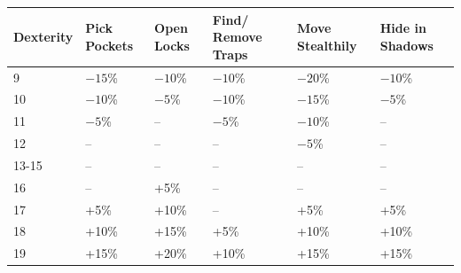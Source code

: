 \noindent
\begin{minipage}{\columnwidth}

\label{thiefdexmods}
\noindent
\begin{tabular}{|m{}|m{}|m{}|m{}|m{}|m{}|}
\hline
Dexterity	& Pick Pockets	& Open Locks	& Find/ Remove Traps	& Move Stealthily	& Hide in Shadows \\
\hline\hline
\rowcolor[gray]{.9}9		& $-15$\%	& $-10$\%	& $-10$\%	& $-20$\%	& $-10$\% \\
10		& $-10$\%	& $-5$\%	& $-10$\%	& $-15$\%	& $-5$\% \\
\rowcolor[gray]{.9}11		& $-5$\%	& --		& $-5$\%	& $-10$\%	& -- \\
12		& --		& --		& --		& $-5$\%	& -- \\
\rowcolor[gray]{.9}13-15	& --		& --		& --		& --		& -- \\
16		& --		& +5\%		& --		& --		& -- \\
\rowcolor[gray]{.9}17		& +5\%		& +10\%		& --		& +5\%		& +5\% \\
18		& +10\%		& +15\%		& +5\%		& +10\%		& +10\% \\
\rowcolor[gray]{.9}19		& +15\%		& +20\%		& +10\%		& +15\%		& +15\% \\
\hline
\end{tabular}

\end{minipage}

